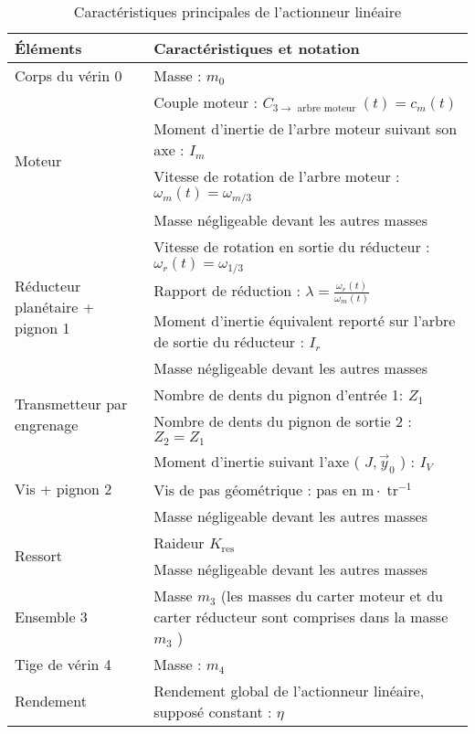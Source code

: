 \begin{table}[!h]
\begin{center}
\begin{tabular}{lp{8cm}}
\hline
\textbf{Éléments} & \textbf{Caractéristiques et notation} \\
\hline
Corps du vérin 0 & Masse : $m_{0}$ \\
\hline
\multirow[t]{4}{*}{Moteur} & Couple moteur : $C_{3 \rightarrow \text { arbre moteur }}(t)=c_{m}(t)$ \\

 & Moment d'inertie de l'arbre moteur suivant son axe : $I_{m}$ \\

 & Vitesse de rotation de l'arbre moteur : $\omega_{m}(t)=\omega_{m / 3}$ \\

 & Masse négligeable devant les autres masses \\
\hline
\multirow[t]{4}{*}{Réducteur planétaire + pignon 1} & Vitesse de rotation en sortie du réducteur : $\omega_{r}(t)=\omega_{1 / 3}$ \\

 & Rapport de réduction : $\lambda=\frac{\omega_{r}(t)}{\omega_{m}(t)}$ \\

 & Moment d'inertie équivalent reporté sur l'arbre de sortie du réducteur : $I_{r}$ \\

 & Masse négligeable devant les autres masses \\
\hline
\multirow[t]{2}{*}{Transmetteur par engrenage} & Nombre de dents du pignon d'entrée 1: $Z_{1}$ \\

 & Nombre de dents du pignon de sortie 2 : $Z_{2}=Z_{1}$ \\
\hline
\multirow[t]{3}{*}{Vis + pignon 2} & Moment d'inertie suivant l'axe ( $J, \vec{y}_{0}$ ) : $I_{V}$ \\

 & Vis de pas géométrique : pas en $\mathrm{m} \cdot \operatorname{tr}^{-1}$ \\

 & Masse négligeable devant les autres masses \\
\hline
\multirow[t]{2}{*}{Ressort} & Raideur $K_{\text {res }}$ \\

 & Masse négligeable devant les autres masses \\
\hline
Ensemble 3 & Masse $m_{3}$ (les masses du carter moteur et du carter réducteur sont comprises dans la masse $m_{3}$ ) \\
\hline
Tige de vérin 4 & Masse : $m_{4}$ \\
\hline
Rendement & Rendement global de l'actionneur linéaire, supposé constant : $\eta$ \\
\hline
\end{tabular}
\caption{\label{ccs_mp_2023_tab_03} Caractéristiques principales de l'actionneur linéaire}
\end{center}
\end{table}

